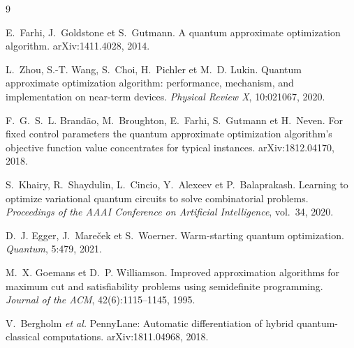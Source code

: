 \documentclass[11pt,a4paper]{article}
\begin{document}
\begin{thebibliography}{9}

E.~Farhi, J.~Goldstone et S.~Gutmann.
\newblock A quantum approximate optimization algorithm.
\newblock arXiv:1411.4028, 2014.

L.~Zhou, S.-T. Wang, S.~Choi, H.~Pichler et M.~D. Lukin.
\newblock Quantum approximate optimization algorithm: performance, mechanism, and implementation on
near-term devices.
\newblock \emph{Physical Review X}, 10:021067, 2020.

F.~G.~S.~L. Brandão, M.~Broughton, E.~Farhi, S.~Gutmann et H.~Neven.
\newblock For fixed control parameters the quantum approximate optimization algorithm's objective
function value concentrates for typical instances.
\newblock arXiv:1812.04170, 2018.

S.~Khairy, R.~Shaydulin, L.~Cincio, Y.~Alexeev et P.~Balaprakash.
\newblock Learning to optimize variational quantum circuits to solve combinatorial problems.
\newblock \emph{Proceedings of the AAAI Conference on Artificial Intelligence}, vol.~34, 2020.

D.~J. Egger, J.~Mareček et S.~Woerner.
\newblock Warm-starting quantum optimization.
\newblock \emph{Quantum}, 5:479, 2021.

M.~X. Goemans et D.~P. Williamson.
\newblock Improved approximation algorithms for maximum cut and satisfiability problems using
semidefinite programming.
\newblock \emph{Journal of the ACM}, 42(6):1115--1145, 1995.

V.~Bergholm \emph{et al.}
\newblock PennyLane: Automatic differentiation of hybrid quantum-classical computations.
\newblock arXiv:1811.04968, 2018.

\end{thebibliography}
\end{document}
